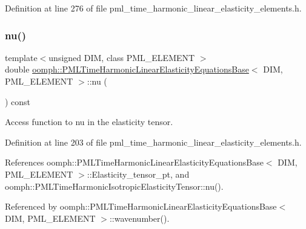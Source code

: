 Definition at line 276 of file pml\+\_\+time\+\_\+harmonic\+\_\+linear\+\_\+elasticity\+\_\+elements.\+h.

\mbox{\label{classoomph_1_1PMLTimeHarmonicLinearElasticityEquationsBase_aa2a77d04dddbcbf3a093d4be044d1355}} 
\subsubsection{\texorpdfstring{nu()}{nu()}}
{\footnotesize\ttfamily template$<$unsigned D\+IM, class P\+M\+L\+\_\+\+E\+L\+E\+M\+E\+NT $>$ \\
double \hyperlink{classoomph_1_1PMLTimeHarmonicLinearElasticityEquationsBase}{oomph\+::\+P\+M\+L\+Time\+Harmonic\+Linear\+Elasticity\+Equations\+Base}$<$ D\+IM, P\+M\+L\+\_\+\+E\+L\+E\+M\+E\+NT $>$\+::nu (\begin{DoxyParamCaption}{ }\end{DoxyParamCaption}) const\hspace{0.3cm}{\ttfamily [inline]}}



Access function to nu in the elasticity tensor. 



Definition at line 203 of file pml\+\_\+time\+\_\+harmonic\+\_\+linear\+\_\+elasticity\+\_\+elements.\+h.



References oomph\+::\+P\+M\+L\+Time\+Harmonic\+Linear\+Elasticity\+Equations\+Base$<$ D\+I\+M, P\+M\+L\+\_\+\+E\+L\+E\+M\+E\+N\+T $>$\+::\+Elasticity\+\_\+tensor\+\_\+pt, and oomph\+::\+P\+M\+L\+Time\+Harmonic\+Isotropic\+Elasticity\+Tensor\+::nu().



Referenced by oomph\+::\+P\+M\+L\+Time\+Harmonic\+Linear\+Elasticity\+Equations\+Base$<$ D\+I\+M, P\+M\+L\+\_\+\+E\+L\+E\+M\+E\+N\+T $>$\+::wavenumber().

\mbox{\label{classoomph_1_1PMLTimeHarmonicLinearElasticityEquationsBase_ab38d63030140509919e021c6abe21ef7}} 
